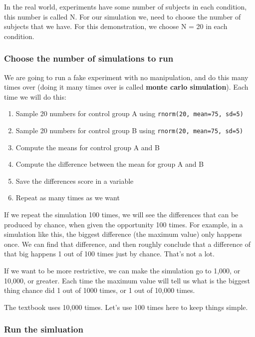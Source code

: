 \documentclass[]{book}
\providecommand{\tightlist}{%
  \setlength{\itemsep}{0pt}\setlength{\parskip}{0pt}}
\theoremstyle{definition}
\theoremstyle{definition}
\theoremstyle{definition}
\theoremstyle{remark}
\begin{document}
In the real world, experiments have some number of subjects in each
condition, this number is called N. For our simulation we, need to
choose the number of subjects that we have. For this demonstration, we
choose N = 20 in each condition.

\subsubsection{Choose the number of simulations to
run}\label{choose-the-number-of-simulations-to-run}

We are going to run a fake experiment with no manipulation, and do this
many times over (doing it many times over is called \textbf{monte carlo
simulation}). Each time we will do this:

\begin{enumerate}
\def\labelenumi{\arabic{enumi}.}
\tightlist
\item
  Sample 20 numbers for control group A using
  \texttt{rnorm(20,\ mean=75,\ sd=5)}
\item
  Sample 20 numbers for control group B using
  \texttt{rnorm(20,\ mean=75,\ sd=5)}
\item
  Compute the means for control group A and B
\item
  Compute the difference between the mean for group A and B
\item
  Save the differences score in a variable
\item
  Repeat as many times as we want
\end{enumerate}

If we repeat the simulation 100 times, we will see the differences that
can be produced by chance, when given the opportunity 100 times. For
example, in a simulation like this, the biggest difference (the maximum
value) only happens once. We can find that difference, and then roughly
conclude that a difference of that big happens 1 out of 100 times just
by chance. That's not a lot.

If we want to be more restrictive, we can make the simulation go to
1,000, or 10,000, or greater. Each time the maximum value will tell us
what is the biggest thing chance did 1 out of 1000 times, or 1 out of
10,000 times.

The textbook uses 10,000 times. Let's use 100 times here to keep things
simple.

\subsubsection{Run the simluation}\label{run-the-simluation}
\end{document}
